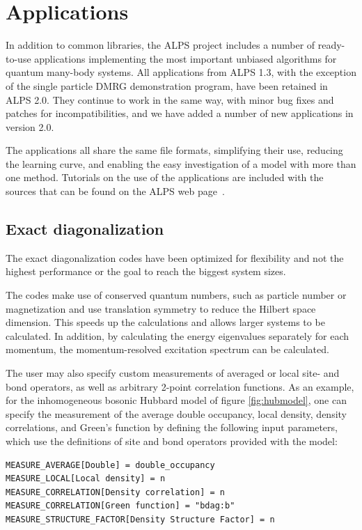 \documentclass[12pt]{iopart}
\begin{document}
\section{Applications}
\label{sec:applications}
In addition to common libraries, the ALPS project includes a number of ready-to-use applications implementing the most important unbiased
algorithms for quantum many-body systems. All applications from ALPS 1.3, with the exception of the single particle DMRG demonstration program, have been retained in ALPS 2.0. They continue to work in the same way, with minor bug fixes and patches for incompatibilities, and we have added a number of new applications in version 2.0.

The applications all
share the same file formats, simplifying their use, reducing the
learning curve, and enabling the easy investigation of a model with
more than one method. Tutorials on the use of the applications are
included with the sources that can be found on the ALPS web
page~\cite{alps}.

\subsection{Exact diagonalization}

The exact diagonalization codes have been optimized for flexibility and not the highest performance or the goal to reach the biggest system sizes.

The codes make use of conserved quantum numbers, such as particle number or magnetization and use translation symmetry to reduce the Hilbert space dimension. This speeds up the calculations and allows larger systems to be calculated. In addition, by calculating the energy eigenvalues separately for each momentum, the momentum-resolved excitation spectrum can be calculated.

The user may also specify custom measurements of averaged or local site- and bond operators, as well as arbitrary 2-point correlation functions. As an example, for the inhomogeneous bosonic Hubbard model of figure \ref{fig:hubmodel}, one can specify the measurement of the average double occupancy, local density, density correlations, and Green's function by defining the following input parameters, which use the definitions of site and bond operators provided with the model:

\begin{verbatim}
MEASURE_AVERAGE[Double] = double_occupancy
MEASURE_LOCAL[Local density] = n
MEASURE_CORRELATION[Density correlation] = n
MEASURE_CORRELATION[Green function] = "bdag:b"
MEASURE_STRUCTURE_FACTOR[Density Structure Factor] = n
\end{verbatim}
\end{document}
